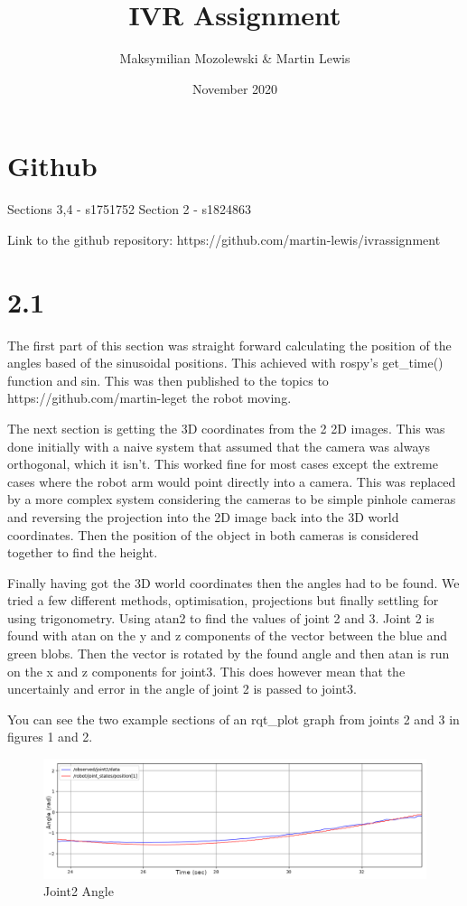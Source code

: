 \documentclass[11pt]{report}
\title{IVR Assignment}
\author{Maksymilian Mozolewski \& Martin Lewis}
\date{November 2020}
\begin{document}

\section*{Github}
Sections 3,4 - s1751752
Section 2 - s1824863

\noindent Link to the github repository:  https://github.com/martin-lewis/ivrassignment

\section*{2.1}

The first part of this section was straight forward calculating the position of the angles based of the sinusoidal positions. This achieved with rospy's get\_time() function and sin.
This was then published to the topics to 
\noindent https://github.com/martin-leget the robot moving.

The next section is getting the 3D coordinates from the 2 2D images. This was done initially with a naive system that assumed that the camera was always orthogonal,
which it isn't. This worked fine for most cases except the extreme cases where the robot arm would point directly into a camera. This was replaced by a more complex
system considering the cameras to be simple pinhole cameras and reversing the projection into the 2D image back into the 3D world coordinates. Then the position
of the object in both cameras is considered together to find the height.

Finally having got the 3D world coordinates then the angles had to be found. We tried a few different methods, optimisation, projections but finally settling for using trigonometry. Using atan2 to find the values of
joint 2 and 3. Joint 2 is found with atan on the y and z components of the vector between the blue and green blobs. Then the vector is rotated by the found angle
and then atan is run on the x and z components for joint3. This does however mean that the uncertainly and error in the angle of joint 2 is passed to joint3.

You can see the two example sections of an rqt\_plot graph from joints 2 and 3 in figures 1 and 2.
\begin{figure}[H]
    \includegraphics[width=\linewidth]{joint2.png}
    \caption{Joint2 Angle}
\end{figure}
\end{document}
